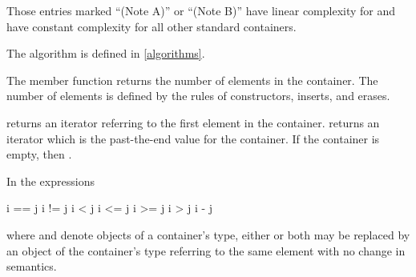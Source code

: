Those entries marked ``(Note A)'' or ``(Note B)''
have linear complexity for  and have constant complexity
for all other standard containers.
\begin{note}
The algorithm  is defined in \ref{algorithms}.
\end{note}

\pnum
The member function  returns the number of elements in the container.
The number of elements is defined by the rules of
constructors, inserts, and erases.

\pnum
{}
returns an iterator referring to the first element in the container.
returns an iterator which is the past-the-end value for the container.
If the container is empty, then
.

\pnum
In the expressions
\begin{codeblock}
i == j
i != j
i < j
i <= j
i >= j
i > j
i - j
\end{codeblock}
where  and  denote objects of a container's 
type, either or both may be replaced by an object of the container's
 type referring to the same element with no change in semantics.

